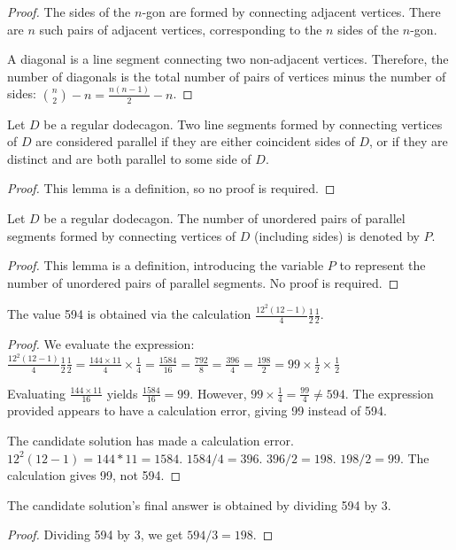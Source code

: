 \begin{tcolorbox}[title=Rewritten Candidate Response, breakable]
\begin{proof}
The sides of the $n$-gon are formed by connecting adjacent vertices. There are $n$ such pairs of adjacent vertices, corresponding to the $n$ sides of the $n$-gon.  

A diagonal is a line segment connecting two non-adjacent vertices.  Therefore, the number of diagonals is the total number of pairs of vertices minus the number of sides: $\binom{n}{2} - n = \frac{n(n-1)}{2} - n$.
\end{proof}

\begin{lemma}
\label{lem:parallel_segments}
Let $D$ be a regular dodecagon. Two line segments formed by connecting vertices of $D$ are considered parallel if they are either coincident sides of $D$, or if they are distinct and are both parallel to some side of $D$. 
\end{lemma}
\begin{proof}
This lemma is a definition, so no proof is required.
\end{proof}

\begin{lemma}
\label{lem:num_parallel_pairs}
Let $D$ be a regular dodecagon.  The number of unordered pairs of parallel segments formed by connecting vertices of $D$ (including sides) is denoted by $P$.
\end{lemma}
\begin{proof}
This lemma is a definition, introducing the variable $P$ to represent the number of unordered pairs of parallel segments. No proof is required.
\end{proof}

\begin{lemma}
\label{lem:mystery_594}
The value 594 is obtained via the calculation $\frac{12^2(12-1)}{4} \frac{1}{2} \frac{1}{2}$.
\end{lemma}
\begin{proof}
We evaluate the expression:
$\frac{12^2(12-1)}{4} \frac{1}{2} \frac{1}{2} = \frac{144 \times 11}{4} \times \frac{1}{4} = \frac{1584}{16} = \frac{792}{8} = \frac{396}{4} = \frac{198}{2} = 99 \times \frac{1}{2} \times \frac{1}{2}$

Evaluating $\frac{144 \times 11}{16}$ yields $\frac{1584}{16} = 99$. However, $99 \times \frac{1}{4} = \frac{99}{4} \neq 594$. The expression provided appears to have a calculation error, giving 99 instead of 594.

The candidate solution has made a calculation error. $12^2 (12-1) = 144 * 11 = 1584$.
$1584/4 = 396$. $396/2 = 198$. $198/2 = 99$. The calculation gives 99, not 594.
\end{proof}

\begin{lemma}
\label{lem:division_by_3}
The candidate solution's final answer is obtained by dividing 594 by 3.
\end{lemma}
\begin{proof}
Dividing 594 by 3, we get $594 / 3 = 198$.
\end{proof}

\end{tcolorbox}

